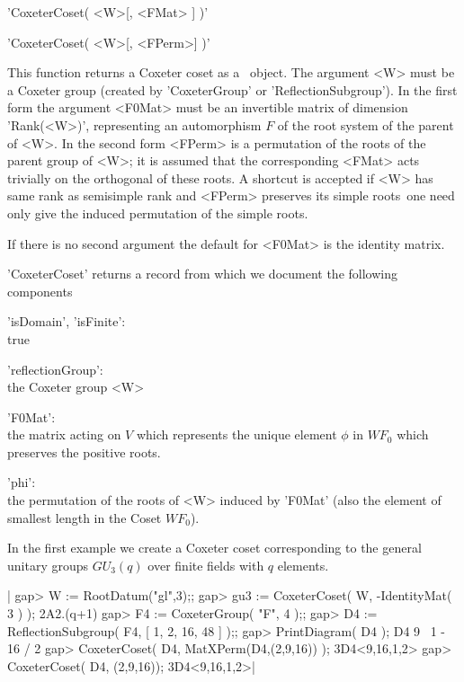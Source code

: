 
'CoxeterCoset( <W>[, <FMat> ] )'

'CoxeterCoset( <W>[, <FPerm>] )'

This  function returns a Coxeter coset as  a \GAP\ object. The argument <W>
must be a Coxeter group (created by 'CoxeterGroup' or
'ReflectionSubgroup').  In the first  form the argument  <F0Mat> must be an
invertible  matrix of  dimension 'Rank(<W>)',  representing an automorphism
$F$  of the root system of the parent of <W>. In the second form <FPerm> is
a  permutation of the roots of the parent  group of <W>; it is assumed that
the corresponding <FMat> acts trivially on the orthogonal of these roots. A
shortcut  is accepted if <W>  has same rank as  semisimple rank and <FPerm>
preserves its simple roots\:\ one need only give the induced permutation of
the simple roots.

If  there is  no second  argument the  default for  <F0Mat> is the identity
matrix.

'CoxeterCoset' returns a record  from   which we document the   following
components\:

'isDomain', 'isFinite':\\
        true

'reflectionGroup':\\
        the Coxeter group <W>

'F0Mat':\\
        the matrix acting on $V$ which represents the unique element $\phi$
in $WF_0$ which preserves the positive roots.

'phi':\\
        the permutation of the roots of <W> induced by 'F0Mat'
        (also the element of smallest length in the Coset $WF_0$).

In  the  first example  we create a  Coxeter  coset corresponding  to the
general unitary groups $GU_3(q)$ over finite fields with $q$ elements.

|    gap> W := RootDatum("gl",3);;
    gap> gu3 := CoxeterCoset( W, -IdentityMat( 3 ) );
    2A2.(q+1)
    gap> F4 := CoxeterGroup( "F", 4 );;
    gap> D4 := ReflectionSubgroup( F4, [ 1, 2, 16, 48 ] );;
    gap> PrintDiagram( D4 );
    D4 9
        \
         1 - 16
        /
       2
    gap> CoxeterCoset( D4, MatXPerm(D4,(2,9,16)) );
    3D4<9,16,1,2>
    gap> CoxeterCoset( D4, (2,9,16));
    3D4<9,16,1,2>|

